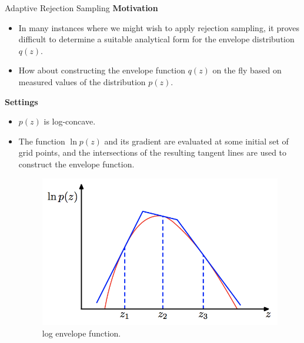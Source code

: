 \documentclass{bredelebeamer}
\begin{document}
\begin{frame}{Adaptive Rejection Sampling}
  \textbf{Motivation}\\
  \begin{itemize}
    \item In many instances where we might wish to apply rejection sampling,
    it proves difficult to determine a suitable analytical form for the
    envelope distribution $q(z)$.
    \item How about constructing the envelope function $q(z)$ on the fly
    based on measured values of the distribution $p(z)$.
  \end{itemize}

  \textbf{Settings}\\
  \begin{itemize}
    \item $p(z)$ is log-concave.
    \item The function $\ln p(z)$ and its gradient are evaluated at some
    initial set of grid points, and the intersections of the resulting tangent
    lines are used to construct the envelope function.
    \begin{figure}
    \centering
    \includegraphics[scale=0.3]{log_env_func.png}
    \caption{
      log envelope function.
    }
    \end{figure}
  \end{itemize}
\end{frame}
\end{document}
